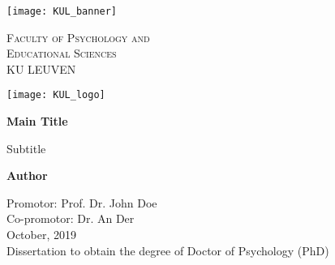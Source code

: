 \begin{titlepage}
    \begin{center}
     
       \texttt{[image: KUL\_banner]}%
       
       \vspace*{0.5cm}

        \textsc{Faculty of Psychology and}\\
        \textsc{Educational Sciences}\\ 
        KU LEUVEN\\
        
         \vspace*{0.7cm}

		\texttt{[image: KUL\_logo]}
		
		 \vspace*{0.5cm}

 
        \Huge
        \textbf{Main Title}
 
        \vspace{0.5cm}
        \LARGE
        Subtitle
 
        \vspace{1.5cm}
 
        \textbf{Author}
 
        \vfill
 
        \vspace{0.8cm}
  
        \Large
        Promotor: Prof. Dr. John Doe\\
        Co-promotor: Dr. An Der\\[1\baselineskip]
      
        October, 2019\\[2\baselineskip]
        
                
        \large
        Dissertation to obtain the degree of Doctor of Psychology (PhD)\\
 
    \end{center}
\end{titlepage}